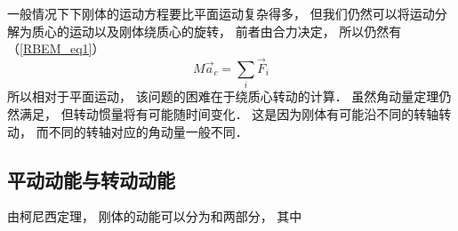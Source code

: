 

一般情况下下刚体的运动方程要比平面运动复杂得多， 但我们仍然可以将运动分解为质心的运动以及刚体绕质心的旋转， 前者由合力决定， 所以仍然有（\autoref{RBEM_eq1}）
\begin{equation}
M\vec a_c = \sum_i \vec F_i
\end{equation}
所以相对于平面运动， 该问题的困难在于绕质心转动的计算． 虽然角动量定理仍然满足， 但转动惯量将有可能随时间变化． 这是因为刚体有可能沿不同的转轴转动， 而不同的转轴对应的角动量一般不同．


\subsection{平动动能与转动动能}
由柯尼西定理， 刚体的动能可以分为和两部分， 其中
